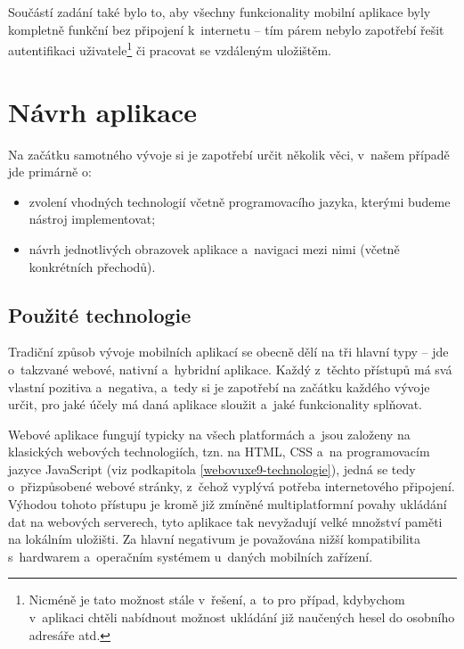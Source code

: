 Součástí zadání také bylo to, aby všechny funkcionality mobilní aplikace
byly kompletně funkční bez připojení k~internetu -- tím párem nebylo
zapotřebí řešit autentifikaci
uživatele\footnote{Nicméně je tato možnost stále v~řešení, a~to pro případ, kdybychom v~aplikaci chtěli nabídnout možnost ukládání již naučených hesel do osobního adresáře atd.}
či pracovat se vzdáleným uložištěm.

\hypertarget{nuxe1vrh-aplikace}{%
\section{Návrh aplikace}\label{nuxe1vrh-aplikace}}

Na začátku samotného vývoje si je zapotřebí určit několik věci, v~našem
případě jde primárně o:

\begin{itemize}
\tightlist
\item
  zvolení vhodných technologií včetně programovacího jazyka, kterými
  budeme nástroj implementovat;
\item
  návrh jednotlivých obrazovek aplikace a~navigaci mezi nimi (včetně
  konkrétních přechodů).
\end{itemize}

\hypertarget{pouux17eituxe9-technologie}{%
\subsection{Použité technologie}\label{pouux17eituxe9-technologie}}

Tradiční způsob vývoje mobilních aplikací se obecně dělí na tři hlavní
typy -- jde o~takzvané webové, nativní a~hybridní aplikace. Každý
z~těchto přístupů má svá vlastní pozitiva a~negativa, a~tedy si je
zapotřebí na začátku každého vývoje určit, pro jaké účely má daná
aplikace sloužit a~jaké funkcionality splňovat.

Webové aplikace fungují typicky na všech platformách a~jsou založeny na
klasických webových technologiích, tzn. na HTML, CSS a~na programovacím
jazyce JavaScript (viz podkapitola \ref{webovuxe9-technologie}), jedná
se tedy o~přizpůsobené webové stránky, z~čehož vyplývá potřeba
internetového připojení. Výhodou tohoto přístupu je kromě již zmíněné
multiplatformní povahy ukládání dat na webových serverech, tyto aplikace
tak nevyžadují velké množství paměti na lokálním uložišti. Za hlavní
negativum je považována nižší kompatibilita s~hardwarem a~operačním
systémem u~daných mobilních zařízení.

